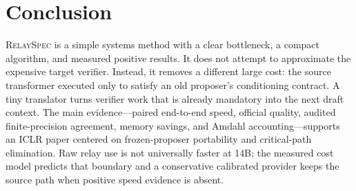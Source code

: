 \documentclass[10pt]{article}
\newcommand{\method}{\textsc{RelaySpec}}
\begin{document}
\section{Conclusion}

\method{} is a simple systems method with a clear bottleneck, a compact
algorithm, and measured positive results. It does not attempt to approximate
the expensive target verifier. Instead, it removes a different large cost:
the source transformer executed only to satisfy an old proposer's conditioning
contract. A tiny translator turns verifier work that is already mandatory
into the next draft context. The main evidence---paired end-to-end speed,
official quality, audited finite-precision agreement, memory savings, and
Amdahl accounting---supports an ICLR paper centered on frozen-proposer
portability and critical-path elimination. Raw relay use is not universally
faster at 14B; the measured cost model predicts that boundary and a
conservative calibrated provider keeps the source path when positive speed
evidence is absent.



\end{document}
